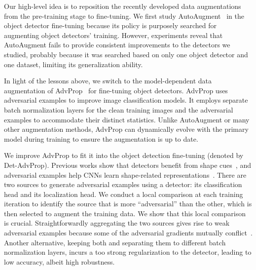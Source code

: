 \documentclass[final]{cvpr}
\begin{document}
Our high-level idea is to reposition the recently developed data augmentations from the pre-training stage to fine-tuning. We first study AutoAugment~\cite{zoph2019learning} in the object detector fine-tuning because its policy is purposely searched for augmenting object detectors' training. However, experiments reveal that AutoAugment fails to provide consistent improvements to the detectors we studied, probably because it was searched based on only one object detector and one dataset, limiting its generalization ability. 







In light of the lessons above, we switch to the model-dependent data augmentation of AdvProp~\cite{xie2020advprop} for fine-tuning object detectors. AdvProp uses adversarial examples to improve image classification models. It employs separate batch normalization layers for the clean training images and the adversarial examples to accommodate their distinct statistics. Unlike AutoAugment or many other augmentation methods, AdvProp can dynamically evolve with the primary model during training to ensure the augmentation is up to date. 

We improve AdvProp to fit it into the object detection fine-tuning (denoted by Det-AdvProp). 
Previous works show that detectors benefit from shape cues~\cite{geirhos2018imagenettrained}, and adversarial examples help CNNs learn shape-related representations~\cite{zhang2019interpreting}.
There are two sources to generate adversarial examples using a detector: its classification head and its localization head. We conduct a local comparison at each training iteration to identify the source that is more ``adversarial'' than the other, which is then selected to augment the training data.
We show that this local comparison is crucial. Straightforwardly aggregating the two sources gives rise to weak adversarial examples because some of the adversarial gradients mutually conflict~\cite{zhang2019towards}. 
Another alternative, keeping both and separating them to different batch normalization layers, incurs a too strong regularization to the detector, leading to low accuracy, albeit high robustness. 
\end{document}
